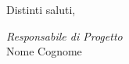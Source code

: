 \documentclass{article}
\begin{document}
Distinti saluti,

\hspace{2cm}
\begin{adjustwidth}{2.5cm}{10.5cm}
  \centering
  \textit{Responsabile di Progetto}\\
  Nome Cognome\\
  \hspace{2cm}
  \underline{\color{white}{Responsabile di Progetto}}
\end{adjustwidth}
\end{document}
